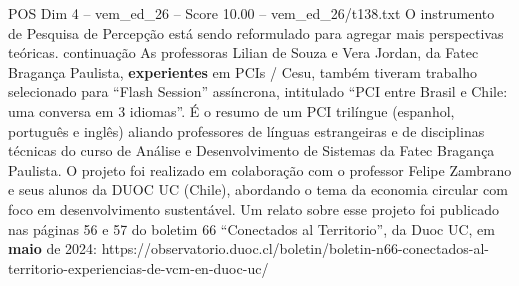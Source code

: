 \begin{textsample}{POS Dim 4 – vem\_ed\_26 – Score 10.00 – vem\_ed\_26/t138.txt}
O instrumento de Pesquisa de Percepção está sendo reformulado para agregar mais perspectivas teóricas. continuação As professoras Lilian de Souza e Vera Jordan, da Fatec Bragança Paulista, \textbf{experientes} em PCIs / Cesu, também tiveram trabalho selecionado para “Flash Session” assíncrona, intitulado “PCI entre Brasil e Chile: uma conversa em 3 idiomas”.
É o resumo de um PCI trilíngue (espanhol, português e inglês) aliando professores de línguas estrangeiras e de disciplinas técnicas do curso de Análise e Desenvolvimento de Sistemas da Fatec Bragança Paulista.
O projeto foi realizado em colaboração com o professor Felipe Zambrano e seus alunos da DUOC UC (Chile), abordando o tema da economia circular com foco em desenvolvimento sustentável.
Um relato sobre esse projeto foi publicado nas páginas 56 e 57 do boletim 66 “Conectados al Territorio”, da Duoc UC, em \textbf{maio} de 2024: https://observatorio.duoc.cl/boletin/boletin-n66-conectados-al-territorio-experiencias-de-vcm-en-duoc-uc/

\end{textsample}
